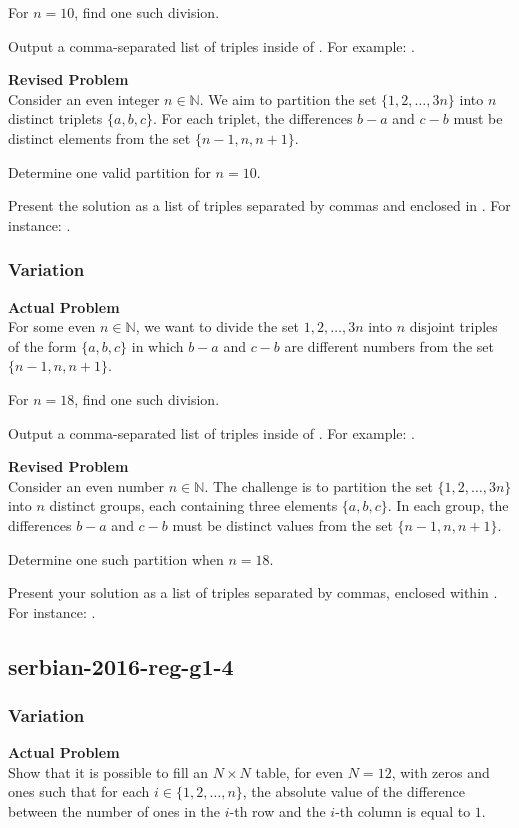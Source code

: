 For $n = 10$, find one such division.

Output a comma-separated list of triples inside of \boxed. For example: .

\textbf{Revised Problem}\\
Consider an even integer $n \in \mathbb{N}$. We aim to partition the set $\{1, 2, \ldots, 3n\}$ into $n$ distinct triplets $\{a, b, c\}$. For each triplet, the differences $b-a$ and $c-b$ must be distinct elements from the set $\{n-1, n, n+1\}$.

Determine one valid partition for $n = 10$.

Present the solution as a list of triples separated by commas and enclosed in \boxed. For instance: .

\subsubsection{Variation}
\textbf{Actual Problem}\\
For some even $n \in \mathbb{N}$, we want to divide the set ${1, 2, \ldots, 3n}$ into $n$ disjoint triples of the form $\{a,b,c\}$ in which $b-a$ and $c-b$ are different numbers from the set $\{n-1,n,n+1\}$.

For $n = 18$, find one such division.

Output a comma-separated list of triples inside of \boxed. For example: .

\textbf{Revised Problem}\\
Consider an even number $n \in \mathbb{N}$. The challenge is to partition the set $\{1, 2, \ldots, 3n\}$ into $n$ distinct groups, each containing three elements $\{a, b, c\}$. In each group, the differences $b-a$ and $c-b$ must be distinct values from the set $\{n-1, n, n+1\}$.

Determine one such partition when $n = 18$.

Present your solution as a list of triples separated by commas, enclosed within \boxed. For instance: .

\subsection{serbian-2016-reg-g1-4}
\subsubsection{Variation}
\textbf{Actual Problem}\\
Show that it is possible to fill an $N \times N$ table, for even $N=12$, with zeros and ones such that for each $i \in\{1,2, \ldots, n\}$, the absolute value of the difference between the number of ones in the $i$-th row and the $i$-th column is equal to $1$.

